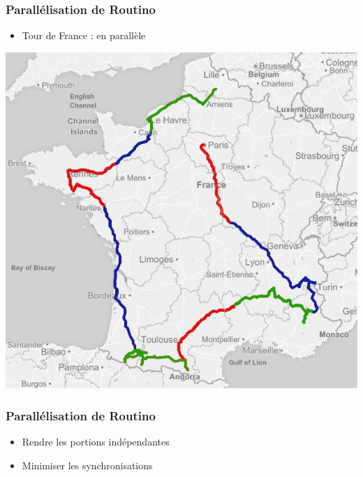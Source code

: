 \begin{frame}
  \frametitle{Parallélisation de Routino}
  
  \begin{itemize}
  \item Tour de France : en parallèle
  \end{itemize}

  \begin{center}
    \includegraphics[scale=0.33]{include/tourfrance_multi.png}
  \end{center}
  
\end{frame}


\begin{frame}
  \frametitle{Parallélisation de Routino}

  \begin{itemize}
  \item Rendre les portions indépendantes
    \vspace{1em}
  \item Minimiser les synchronisations
  \end{itemize}

\end{frame}


